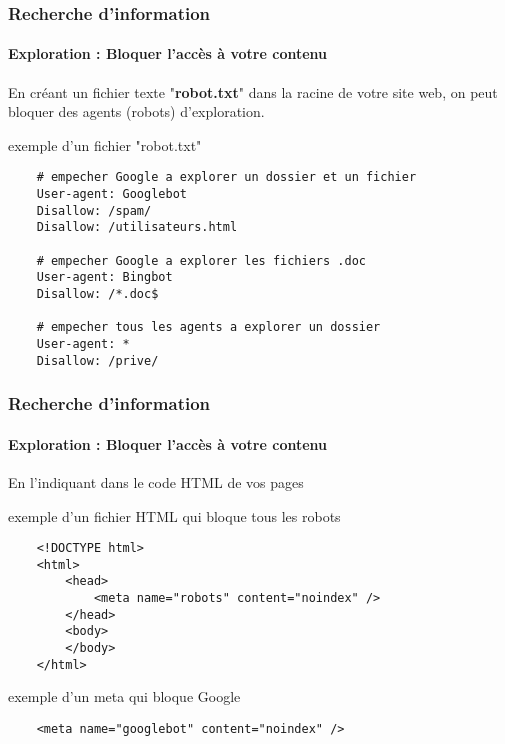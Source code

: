 \documentclass[xcolor=table]{beamer}
\begin{document}
\begin{frame}[fragile]
\frametitle{Recherche d'information}
\framesubtitle{Exploration : Bloquer l'accès à votre contenu}


En créant un fichier texte "\textbf{robot.txt}" dans la racine de votre site web, on peut bloquer des agents (robots) d'exploration.

%	

\begin{exampleblock}{exemple d'un fichier "robot.txt"}
	\scriptsize\bfseries
	\begin{lstlisting}
	# empecher Google a explorer un dossier et un fichier
	User-agent: Googlebot
	Disallow: /spam/ 
	Disallow: /utilisateurs.html
	
	# empecher Google a explorer les fichiers .doc 
	User-agent: Bingbot
	Disallow: /*.doc$ 
	
	# empecher tous les agents a explorer un dossier
	User-agent: *
	Disallow: /prive/
	\end{lstlisting}
\end{exampleblock}


\end{frame}

\begin{frame}[fragile]
\frametitle{Recherche d'information}
\framesubtitle{Exploration : Bloquer l'accès à votre contenu}

En l'indiquant dans le code HTML de vos pages

\begin{exampleblock}{exemple d'un fichier HTML qui bloque tous les robots}
	\scriptsize\bfseries
	\begin{lstlisting}
	<!DOCTYPE html>
	<html>
	    <head>
	        <meta name="robots" content="noindex" />
	    </head>
	    <body>
	    </body>
	</html>
	\end{lstlisting}
\end{exampleblock}

\begin{exampleblock}{exemple d'un meta qui bloque Google}
	\scriptsize\bfseries
	\begin{lstlisting}
	<meta name="googlebot" content="noindex" />
	\end{lstlisting}
\end{exampleblock}

\end{frame}
\end{document}
